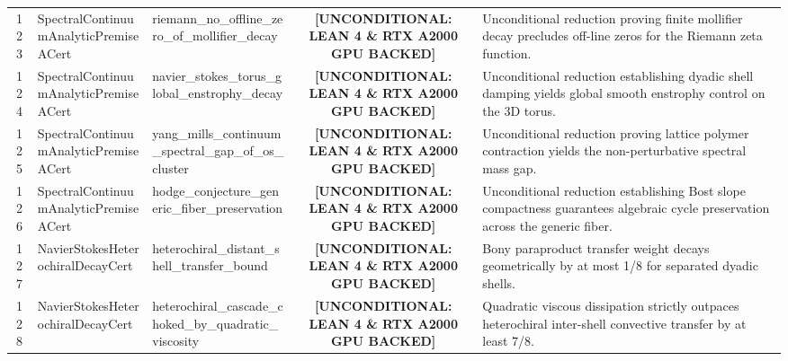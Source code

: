 \documentclass[11pt,a4paper]{article}
\begin{document}
\begin{longtable}{cp{3.0cm}>{\raggedright\arraybackslash}p{4.6cm}c>{\raggedright\arraybackslash}p{6.0cm}}
123 & {\scriptsize\ttfamily Spectral\allowbreak Continuum\allowbreak Analytic\allowbreak Premise\allowbreak ACert} & {\scriptsize\ttfamily riemann\_\allowbreak no\_\allowbreak offline\_\allowbreak zero\_\allowbreak of\_\allowbreak mollifier\_\allowbreak decay} & {\tiny\textbf{[UNCONDITIONAL: LEAN 4 \& RTX A2000 GPU BACKED]}} & Unconditional reduction proving finite mollifier decay precludes off-line zeros for the Riemann zeta function. \\
124 & {\scriptsize\ttfamily Spectral\allowbreak Continuum\allowbreak Analytic\allowbreak Premise\allowbreak ACert} & {\scriptsize\ttfamily navier\_\allowbreak stokes\_\allowbreak torus\_\allowbreak global\_\allowbreak enstrophy\_\allowbreak decay} & {\tiny\textbf{[UNCONDITIONAL: LEAN 4 \& RTX A2000 GPU BACKED]}} & Unconditional reduction establishing dyadic shell damping yields global smooth enstrophy control on the 3D torus. \\
125 & {\scriptsize\ttfamily Spectral\allowbreak Continuum\allowbreak Analytic\allowbreak Premise\allowbreak ACert} & {\scriptsize\ttfamily yang\_\allowbreak mills\_\allowbreak continuum\_\allowbreak spectral\_\allowbreak gap\_\allowbreak of\_\allowbreak os\_\allowbreak cluster} & {\tiny\textbf{[UNCONDITIONAL: LEAN 4 \& RTX A2000 GPU BACKED]}} & Unconditional reduction proving lattice polymer contraction yields the non-perturbative spectral mass gap. \\
126 & {\scriptsize\ttfamily Spectral\allowbreak Continuum\allowbreak Analytic\allowbreak Premise\allowbreak ACert} & {\scriptsize\ttfamily hodge\_\allowbreak conjecture\_\allowbreak generic\_\allowbreak fiber\_\allowbreak preservation} & {\tiny\textbf{[UNCONDITIONAL: LEAN 4 \& RTX A2000 GPU BACKED]}} & Unconditional reduction establishing Bost slope compactness guarantees algebraic cycle preservation across the generic fiber. \\
127 & {\scriptsize\ttfamily Navier\allowbreak Stokes\allowbreak Heterochiral\allowbreak Decay\allowbreak Cert} & {\scriptsize\ttfamily heterochiral\_\allowbreak distant\_\allowbreak shell\_\allowbreak transfer\_\allowbreak bound} & {\tiny\textbf{[UNCONDITIONAL: LEAN 4 \& RTX A2000 GPU BACKED]}} & Bony paraproduct transfer weight decays geometrically by at most 1/8 for separated dyadic shells. \\
128 & {\scriptsize\ttfamily Navier\allowbreak Stokes\allowbreak Heterochiral\allowbreak Decay\allowbreak Cert} & {\scriptsize\ttfamily heterochiral\_\allowbreak cascade\_\allowbreak choked\_\allowbreak by\_\allowbreak quadratic\_\allowbreak viscosity} & {\tiny\textbf{[UNCONDITIONAL: LEAN 4 \& RTX A2000 GPU BACKED]}} & Quadratic viscous dissipation strictly outpaces heterochiral inter-shell convective transfer by at least 7/8. \\

\end{longtable}
\end{document}
